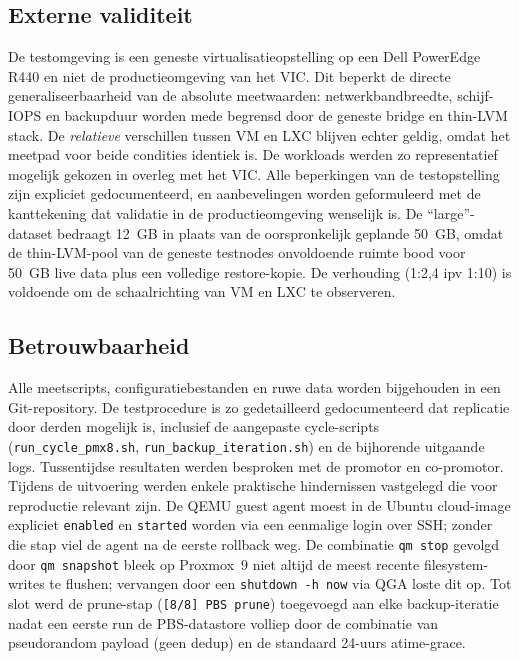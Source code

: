 \subsection{Externe validiteit}
\label{sec:beperkingen-validatie}
De testomgeving is een geneste virtualisatieopstelling op een Dell PowerEdge R440 en niet de productieomgeving van het VIC. Dit beperkt de directe generaliseerbaarheid van de absolute meetwaarden: netwerkbandbreedte, schijf-IOPS en backupduur worden mede begrensd door de geneste bridge en thin-LVM stack. De \emph{relatieve} verschillen tussen VM en LXC blijven echter geldig, omdat het meetpad voor beide condities identiek is. De workloads werden zo representatief mogelijk gekozen in overleg met het VIC. Alle beperkingen van de testopstelling zijn expliciet gedocumenteerd, en aanbevelingen worden geformuleerd met de kanttekening dat validatie in de productieomgeving wenselijk is. De ``large''-dataset bedraagt 12~GB in plaats van de oorspronkelijk geplande 50~GB, omdat de thin-LVM-pool van de geneste testnodes onvoldoende ruimte bood voor 50~GB live data plus een volledige restore-kopie. De verhouding (1:2,4 ipv 1:10) is voldoende om de schaalrichting van VM en LXC te observeren.

\subsection{Betrouwbaarheid}
\label{sec:reproduceerbaarheid-implementatie}
Alle meetscripts, configuratiebestanden en ruwe data worden bijgehouden in een Git-repository. De testprocedure is zo gedetailleerd gedocumenteerd dat replicatie door derden mogelijk is, inclusief de aangepaste cycle-scripts (\texttt{run\_cycle\_pmx8.sh}, \texttt{run\_backup\_iteration.sh}) en de bijhorende uitgaande logs. Tussentijdse resultaten werden besproken met de promotor en co-promotor. Tijdens de uitvoering werden enkele praktische hindernissen vastgelegd die voor reproductie relevant zijn. De QEMU guest agent moest in de Ubuntu cloud-image expliciet \texttt{enabled} en \texttt{started} worden via een eenmalige login over SSH; zonder die stap viel de agent na de eerste rollback weg. De combinatie \texttt{qm stop} gevolgd door \texttt{qm snapshot} bleek op Proxmox~9 niet altijd de meest recente filesystem-writes te flushen; vervangen door een \texttt{shutdown -h now} via QGA loste dit op. Tot slot werd de prune-stap (\texttt{[8/8] PBS prune}) toegevoegd aan elke backup-iteratie nadat een eerste run de PBS-datastore volliep door de combinatie van pseudorandom payload (geen dedup) en de standaard 24-uurs atime-grace.

